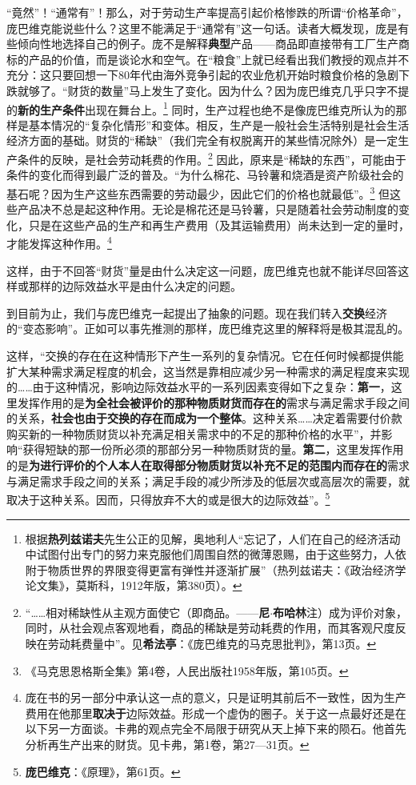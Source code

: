 \documentclass[fontset=fandol, a4paper, 12pt, openright]{ctexbook}
\begin{document}
“竟然”！“通常有”！那么，对于劳动生产率提高引起价格惨跌的所谓“价格革命”，庞巴维克能说些什么？这里不能满足于“通常有”这一句话。读者大概发现，庞是有些倾向性地选择自己的例子。庞不是解释\textbf{典型}产品——商品即直接带有工厂生产商标的产品的价值，而是谈论水和空气。在“粮食”上就已经看出我们教授的观点并不充分：这只要回想一下80年代由海外竞争引起的农业危机开始时粮食价格的急剧下跌就够了。“财货的数量”马上发生了变化。因为什么？因为庞巴维克几乎只字不提的\textbf{新的生产条件}出现在舞台上。\footnote{根据\textbf{热列兹诺夫}先生公正的见解，奥地利人“忘记了，人们在自己的经济活动中试图付出专门的努力来克服他们周围自然的微薄恩赐，由于这些努力，人依附于物质世界的界限变得更富有弹性并逐渐扩展”（热列兹诺夫：《政治经济学论文集》，莫斯科，1912年版，第380页）。} 同时，生产过程也绝不是像庞巴维克所认为的那样是基本情况的“复杂化情形”和变体。相反，生产是一般社会生活特别是社会生活经济方面的基础。财货的“稀缺”（我们完全有权脱离开的某些情况除外）是一定生产条件的反映，是社会劳动耗费的作用。\footnote{“……相对稀缺性从主观方面使它（即商品。——\textbf{尼}$\cdot$\textbf{布哈林}注）成为评价对象，同时，从社会观点客观地看，商品的稀缺是劳动耗费的作用，而其客观尺度反映在劳动耗费量中”。见\textbf{希法亭}：《庞巴维克的马克思批判》，第13页。} 因此，原来是“稀缺的东西”，可能由于条件的变化而得到最广泛的普及。“为什么棉花、马铃薯和烧酒是资产阶级社会的基石呢？因为生产这些东西需要的劳动最少，因此它们的价格也就最低”。\footnote{《马克思恩格斯全集》第4卷，人民出版社1958年版，第105页。} 但这些产品决不总是起这种作用。无论是棉花还是马铃薯，只是随着社会劳动制度的变化，只是在这些产品的生产和再生产费用（及其运输费用）尚未达到一定的量时，才能发挥这种作用。\footnote{庞在书的另一部分中承认这一点的意义，只是证明其前后不一致性，因为生产费用在他那里\textbf{取决于}边际效益。形成一个虚伪的圈子。关于这一点最好还是在以下另一方面谈。卡弗的观点完全不局限于研究从天上掉下来的陨石。他首先分析再生产出来的财货。见卡弗，第1卷，第27—31页。}

这样，由于不回答“财货”量是由什么决定这一问题，庞巴维克也就不能详尽回答这样或那样的边际效益水平是由什么决定的问题。

到目前为止，我们与庞巴维克一起提出了抽象的问题。现在我们转入\textbf{交换}经济的“变态影响”。正如可以事先推测的那样，庞巴维克这里的解释将是极其混乱的。

这样，“交换的存在在这种情形下产生一系列的复杂情况。它在任何时候都提供能扩大某种需求满足程度的机会，这当然是靠相应减少另一种需求的满足程度来实现的……由于这种情况，影响边际效益水平的一系列因素变得如下之复杂：\textbf{第一}，这里发挥作用的是\textbf{为全社会被评价的那种物质财货而存在的}需求与满足需求手段之间的关系，\textbf{社会也由于交换的存在而成为一个整体}。这种关系……决定着需要付价款购买新的一种物质财货以补充满足相关需求中的不足的那种价格的水平”，并影响“获得短缺的那一份所必须的那部分另一种物质财货的量。\textbf{第二}，这里发挥作用的是\textbf{为进行评价的个人本人在取得部分物质财货以补充不足的范围内而存在的}需求与满足需求手段之间的关系；满足手段的减少所涉及的低层次或高层次的需要，就取决于这种关系。因而，只得放弃不大的或是很大的边际效益”。\footnote{\textbf{庞巴维克}：《原理》，第61页。}
\end{document}
